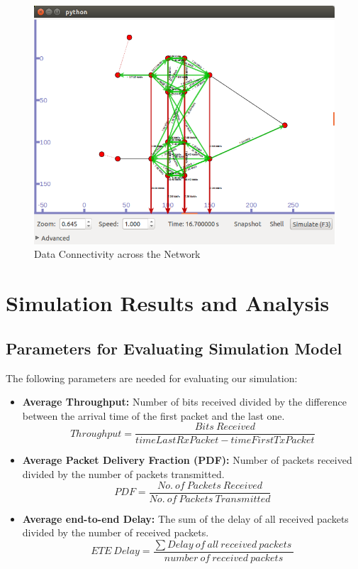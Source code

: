 \documentclass[12pt,a4paper]{report}
\begin{document}
\begin{figure}[hbtp]
\centering
\includegraphics[scale=.45]{mesh-2x2-working.png}
\caption{Data Connectivity across the Network}
\end{figure}


\chapter{Simulation Results and Analysis}

\section{Parameters for Evaluating Simulation Model}
The following parameters are needed for evaluating our simulation:
\begin{itemize}


\item{\textbf{Average Throughput:}}
Number of bits received divided by the difference between the arrival time of the first packet and the last one.
$$Throughput = \frac{Bits\ Received}{timeLastRxPacket - timeFirstTxPacket} $$

\item{\textbf{Average Packet Delivery Fraction (PDF):}}
Number of packets received divided by the number of packets transmitted.
$$PDF = \frac{No.\ of\ Packets\ Received}{No.\ of\ Packets\ Transmitted}$$
\item{\textbf{Average end-to-end Delay:}}
The sum of the delay of all received packets divided by the number of received packets.
$$ETE\ Delay =  \frac{\sum\nolimits Delay\ of\ all\ received\ packets\ }{number\ of\ received\ packets}  $$
\end{itemize}
\end{document}
